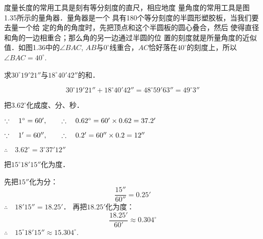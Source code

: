 度量长度的常用工具是刻有等分刻度的直尺，相应地度
量角度的常用工具是图1.35所示的量角器．量角器是一个
具有180个等分刻度的半圆形塑胶板，当我们要去量一个给
定的角的角度时，先把顶点和这个半圆板的圆心叠合，然后
使得直径和角的一边相重合；那么角的另一边通过半圆的位
置的刻度就是所量角度的近似值．如图1.36中的$\angle BAC$,
$AB$与$0^{\circ}$线重合，$AC$恰好落在$40^{\circ}$的刻度上，所以$\angle BAC=40^{\circ}$.

\begin{figure}[htp]
	\centering
{}	
	\caption{}
\end{figure}

\begin{example}
	求$30^{\circ}19'21''$与$18^{\circ}40'42''$的和．
\end{example}

\begin{solution}
\[30^{\circ}19'21''+18^{\circ}40'42''=48^{\circ}59'63''=49^{\circ}3''\]
\end{solution}

\begin{example}
	把$3.62^{\circ}$化成度、分、秒．
\end{example}

\begin{solution}
$\because\quad 1^{\circ}=60',\qquad \therefore\quad 0.62^{\circ}=60'\times 0.62=37.2'$

$\because\quad 1'=60'',\qquad \therefore\quad 0.2'=60''\times 0.2=12''$

$\therefore\quad 3.62^{\circ}=3^{\circ}37'12''$
\end{solution}

\begin{example}
	把$15^{\circ}18'15''$化为度．
\end{example}


\begin{solution}
	先把$15''$化为分：
\[\frac{15''}{60''}=0.25'\]
$\therefore\quad 18'15''=18.25'$．
再把$18.25'$化为度：
\[\frac{18.25'}{60'}\approx 0.304^{\circ}\]
$\therefore\quad 15^{\circ}18'15''\approx 15.304^{\circ}$.
\end{solution}

